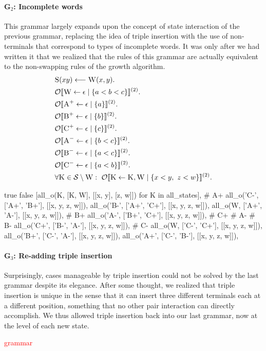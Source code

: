 \documentclass[nonatbib,numbers,10pt]{sigplanconf}
\newcommand\todo[1]{\textcolor{red}{#1}}
\newcommand\s{\textsc}
\newcommand{\Orderr}[5]{
	\mathcal{#1}\llbracket #2 \leftarrow #3 \mid \{ #4 \} \rrbracket^{(#5)}.
}
\newcommand{\Or}[4]{\Orderr{O}{#1}{#2}{#3}{#4}}
\begin{document}
\paragraph{G$_2$: Incomplete words}
This grammar largely expands upon the concept of state interaction of the previous grammar, replacing the idea of triple insertion with the use of non-terminals that correspond to types of incomplete words. It was only after we had written it that we realized that the rules of this grammar are actually equivalent to the non-swapping rules of the growth algorithm.
\begin{align*}
&\s{S}(xy) \longleftarrow \s{W}(x,y). \\
&\Or{\s{W}}{\epsilon}{a < b < c}{2} \\
&\Or{\s{A}^+}{\epsilon}{a}{2} \\
&\Or{\s{B}^+}{\epsilon}{b}{2} \\
&\Or{\s{C}^+}{\epsilon}{c}{2} \\
&\Or{\s{A}^-}{\epsilon}{b < c}{2} \\
&\Or{\s{B}^-}{\epsilon}{a < c}{2} \\
&\Or{\s{C}^-}{\epsilon}{a < b}{2} \\
&\forall \s{K} \in \mathcal{S} \setminus \s{W}:\ \Or{\s{K}}{\s{K}, \s{W}}{x < y,\ z < w}{2}
\end{align*}

\ifx true false
    [all_o(K, [K, W], [[x, y], [z, w]]) for K in all_states],
    # A+
    all_o('C-', ['A+', 'B+'], [[x, y, z, w]]),
    all_o('B-', ['A+', 'C+'], [[x, y, z, w]]),
    all_o(W, ['A+', 'A-'], [[x, y, z, w]]),
    # B+
    all_o('A-', ['B+', 'C+'], [[x, y, z, w]]),
    # C+
    # A-
    # B-
    all_o('C+', ['B-', 'A-'], [[x, y, z, w]]),
    # C-
    all_o(W, ['C-', 'C+'], [[x, y, z, w]]),
    all_o('B+', ['C-', 'A-'], [[x, y, z, w]]),
    all_o('A+', ['C-', 'B-'], [[x, y, z, w]]),
\fi
\paragraph{G$_3$: Re-adding triple insertion}
Surprisingly, cases manageable by triple insertion could not be solved by the last grammar despite its elegance. After some thought, we realized that triple insertion is unique in the sense that it can insert three different terminals each at a different position, something that no other pair interaction can directly accomplish. We thus allowed triple insertion back into our last grammar, now at the level of each new state.

\todo{grammar}
\end{document}
